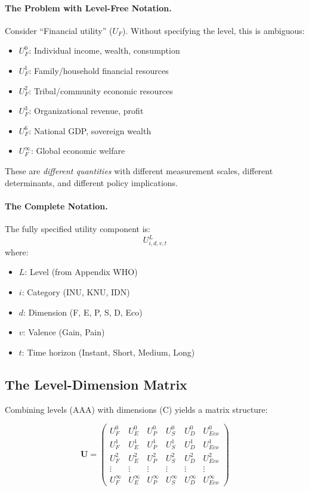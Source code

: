 \paragraph{The Problem with Level-Free Notation.}

Consider ``Financial utility'' ($U_F$). Without specifying the level, this is ambiguous:

\begin{itemize}[nosep]
\item $U^0_F$: Individual income, wealth, consumption
\item $U^1_F$: Family/household financial resources
\item $U^2_F$: Tribal/community economic resources
\item $U^3_F$: Organizational revenue, profit
\item $U^6_F$: National GDP, sovereign wealth
\item $U^{\infty}_F$: Global economic welfare
\end{itemize}

These are \textit{different quantities} with different measurement scales, different 
determinants, and different policy implications.

\paragraph{The Complete Notation.}

The fully specified utility component is:
\begin{equation}
U^L_{i,d,v,t}
\end{equation}
where:
\begin{itemize}[nosep]
\item $L$: Level (from Appendix WHO)
\item $i$: Category (INU, KNU, IDN)
\item $d$: Dimension (F, E, P, S, D, Eco)
\item $v$: Valence (Gain, Pain)
\item $t$: Time horizon (Instant, Short, Medium, Long)
\end{itemize}

\subsection{The Level-Dimension Matrix}

Combining levels (AAA) with dimensions (C) yields a matrix structure:

\begin{equation}
\mathbf{U} = \begin{pmatrix}
U^0_F & U^0_E & U^0_P & U^0_S & U^0_D & U^0_{Eco} \\
U^1_F & U^1_E & U^1_P & U^1_S & U^1_D & U^1_{Eco} \\
U^2_F & U^2_E & U^2_P & U^2_S & U^2_D & U^2_{Eco} \\
\vdots & \vdots & \vdots & \vdots & \vdots & \vdots \\
U^{\infty}_F & U^{\infty}_E & U^{\infty}_P & U^{\infty}_S & U^{\infty}_D & U^{\infty}_{Eco}
\end{pmatrix}
\end{equation}


